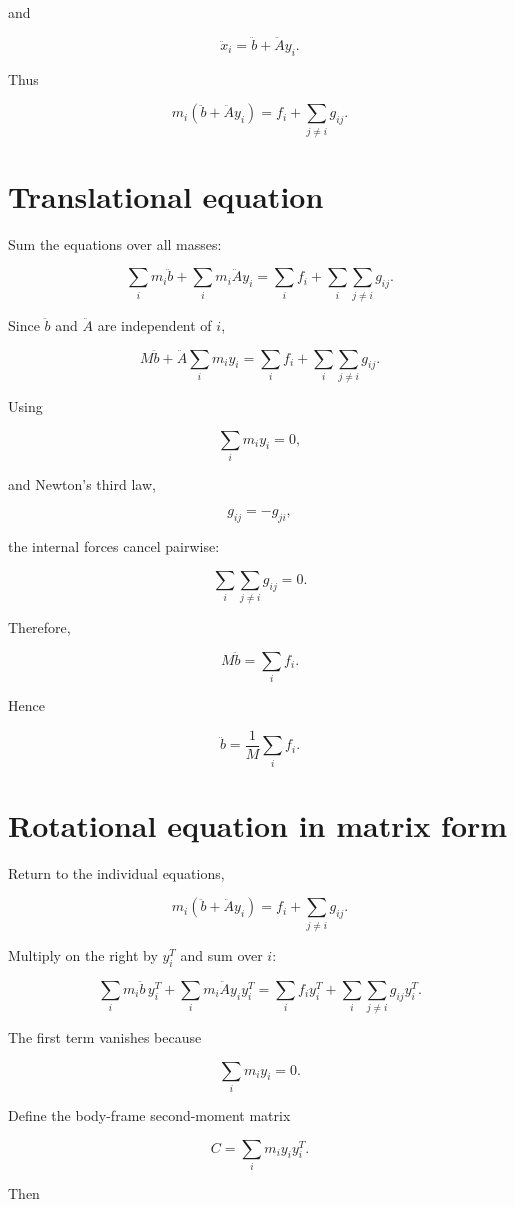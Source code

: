 \documentclass{article}
\begin{document}
and

\[
\ddot{x}_i = \ddot{b}+\ddot{A}y_i.
\]

Thus

\[
m_i\left(\ddot{b}+\ddot{A}y_i\right) = f_i+\sum_{j\ne i}g_{ij}.
\]

\section{Translational equation}

Sum the equations over all masses:

\[
\sum_i m_i\ddot{b} + \sum_i m_i\ddot{A}y_i = \sum_i f_i + \sum_i\sum_{j\ne i}g_{ij}.
\]

Since \(\ddot b\) and \(\ddot A\) are independent of \(i\),

\[
M\ddot b + \ddot A\sum_i m_i y_i = \sum_i f_i + \sum_i\sum_{j\ne i}g_{ij}.
\]

Using

\[
\sum_i m_i y_i=0,
\]

and Newton's third law,

\[
g_{ij}=-g_{ji},
\]

the internal forces cancel pairwise:

\[
\sum_i\sum_{j\ne i}g_{ij}=0.
\]

Therefore,

\[
M\ddot b=\sum_i f_i.
\]

Hence

\[
\ddot b = \frac{1}{M}\sum_i f_i.
\]

\section{Rotational equation in matrix form}

Return to the individual equations,

\[
m_i\left(\ddot b+\ddot A y_i\right) = f_i+\sum_{j\ne i}g_{ij}.
\]

Multiply on the right by \(y_i^T\) and sum over \(i\):

\[
\sum_i m_i\ddot b\,y_i^T + \sum_i m_i\ddot A y_i y_i^T = \sum_i f_i y_i^T + \sum_i\sum_{j\ne i}g_{ij}y_i^T.
\]

The first term vanishes because

\[
\sum_i m_i y_i=0.
\]

Define the body-frame second-moment matrix

\[
C = \sum_i m_i y_i y_i^T.
\]

Then
\end{document}
